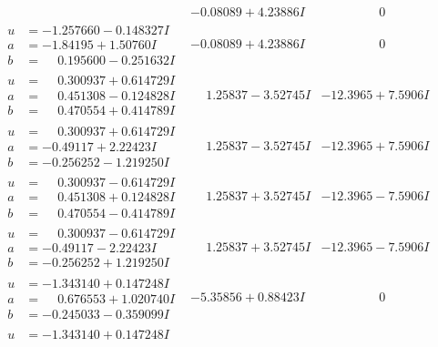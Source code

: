 \documentclass[1p]{elsarticle_modified}
\theoremstyle{definition}
\begin{document}
$$\begin{array}{c|c|c}
 & -0.08089 + 4.23886 I & \phantom{-0.000000 } 0 \\ \hline\begin{aligned}
u &= -1.257660 - 0.148327 I \\
a &= -1.84195 + 1.50760 I \\
b &= \phantom{-}0.195600 - 0.251632 I\end{aligned}
 & -0.08089 + 4.23886 I & \phantom{-0.000000 } 0 \\ \hline\begin{aligned}
u &= \phantom{-}0.300937 + 0.614729 I \\
a &= \phantom{-}0.451308 - 0.124828 I \\
b &= \phantom{-}0.470554 + 0.414789 I\end{aligned}
 & \phantom{-}1.25837 - 3.52745 I & -12.3965 + 7.5906 I \\ \hline\begin{aligned}
u &= \phantom{-}0.300937 + 0.614729 I \\
a &= -0.49117 + 2.22423 I \\
b &= -0.256252 - 1.219250 I\end{aligned}
 & \phantom{-}1.25837 - 3.52745 I & -12.3965 + 7.5906 I \\ \hline\begin{aligned}
u &= \phantom{-}0.300937 - 0.614729 I \\
a &= \phantom{-}0.451308 + 0.124828 I \\
b &= \phantom{-}0.470554 - 0.414789 I\end{aligned}
 & \phantom{-}1.25837 + 3.52745 I & -12.3965 - 7.5906 I \\ \hline\begin{aligned}
u &= \phantom{-}0.300937 - 0.614729 I \\
a &= -0.49117 - 2.22423 I \\
b &= -0.256252 + 1.219250 I\end{aligned}
 & \phantom{-}1.25837 + 3.52745 I & -12.3965 - 7.5906 I \\ \hline\begin{aligned}
u &= -1.343140 + 0.147248 I \\
a &= \phantom{-}0.676553 + 1.020740 I \\
b &= -0.245033 - 0.359099 I\end{aligned}
 & -5.35856 + 0.88423 I & \phantom{-0.000000 } 0 \\ \hline\begin{aligned}
u &= -1.343140 + 0.147248 I \\

\end{aligned}
\end{array}$$
\end{document}

